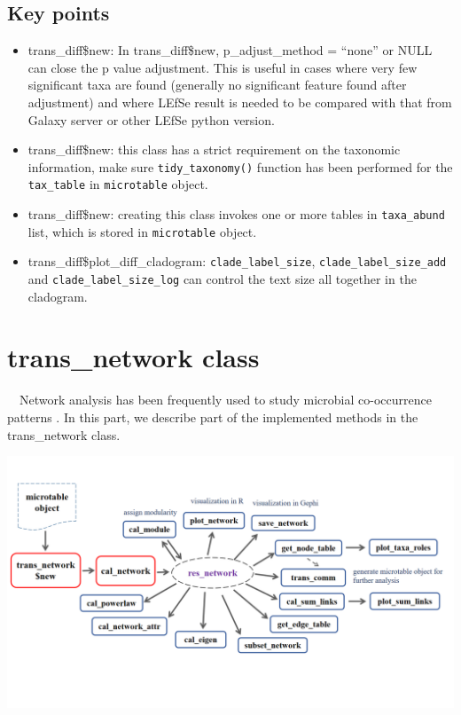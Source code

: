 \documentclass[
]{book}
\providecommand{\tightlist}{%
  \setlength{\itemsep}{0pt}\setlength{\parskip}{0pt}}
\begin{document}
\hypertarget{key-points-5}{%
\subsection{Key points}\label{key-points-5}}

\begin{itemize}
\tightlist
\item
  trans\_diff\$new: In trans\_diff\$new, p\_adjust\_method = ``none'' or NULL can close the p value adjustment.
  This is useful in cases where very few significant taxa are found (generally no significant feature found after adjustment) and
  where LEfSe result is needed to be compared with that from Galaxy server or other LEfSe python version.
\item
  trans\_diff\$new: this class has a strict requirement on the taxonomic information,
  make sure \texttt{tidy\_taxonomy()} function has been performed for the \texttt{tax\_table} in \texttt{microtable} object.
\item
  trans\_diff\$new: creating this class invokes one or more tables in \texttt{taxa\_abund} list, which is stored in \texttt{microtable} object.
\item
  trans\_diff\$plot\_diff\_cladogram: \texttt{clade\_label\_size}, \texttt{clade\_label\_size\_add} and \texttt{clade\_label\_size\_log} can control the text size all together in the cladogram.
\end{itemize}

\hypertarget{trans_network-class}{%
\section{trans\_network class}\label{trans_network-class}}

　Network analysis has been frequently used to study microbial co-occurrence patterns \citep{Deng_Molecular_2012, Faust_Microbial_2012, Coyte_Theecology_2015}.
In this part, we describe part of the implemented methods in the trans\_network class.

\begin{center}\includegraphics[width=8000px]{Images/network_framework} \end{center}
\end{document}
